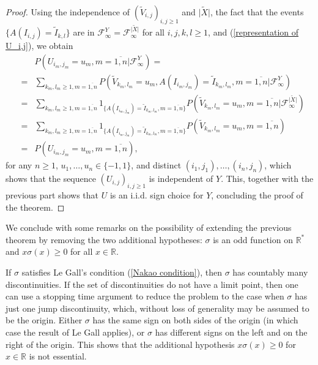 \documentclass[reqno]{amsart}
\theoremstyle{definition}
\theoremstyle{remark}
\numberwithin{equation}{section}
\begin{document}
\begin{proof}
Using the independence of $(\widetilde{V}_{i,j})_{i,j\ge 1}$ and $\vert\widetilde{X}\vert$, the fact that the events $\{A(I_{i,j})=\widetilde{I}_{k,l}\}$ are in $\mathcal{F}_\infty^Y=\mathcal{F}^{\vert\widetilde{X}\vert}_{\infty}$ for all $i,j,k,l\ge 1$, and (\ref{representation of U_i,j}), we obtain
\begin{eqnarray*}
&&P\left(U_{i_m,j_m}=u_m, m=\overline{1,n}\big\vert \mathcal{F}_{\infty}^{Y}\right)=\\
&=&\sum_{k_m,l_m\ge 1, m=\overline{1,n}}P\left(\widetilde{V}_{k_m,l_m}=u_m, A(I_{i_m,j_m})=\widetilde{I}_{k_m,l_m}, m=\overline{1,n} \big\vert \mathcal{F}_{\infty}^{{Y}}\right)\\
&=&\sum_{k_m,l_m\ge 1, m=\overline{1,n}}1_{\{A(I_{i_m,j_m})=\widetilde{I}_{k_m,l_m}, m=\overline{1,n}\}} P\left(\widetilde{V}_{k_m,l_m}=u_m, m=\overline{1,n} \big\vert \mathcal{F}_{\infty}^{\vert\widetilde{X}\vert}\right)\\
&=&\sum_{k_m,l_m\ge 1, m=\overline{1,n}}1_{\{A(I_{i_m,j_m})=\widetilde{I}_{k_m,l_m}, m=\overline{1,n}\}} P\left(\widetilde{V}_{k_m,l_m}=u_m, m=\overline{1,n}\right)\\
&=&P\left(U_{i_m,j_m}=u_m, m=\overline{1,n}\right),
\end{eqnarray*}
for any $n\ge 1$, $u_1,\ldots,u_n\in\{-1,1\}$, and distinct $(i_1,j_1),\ldots,(i_n,j_n)$, which shows that the sequence $(U_{i,j})_{i,j\ge 1}$ is independent of $Y$. This, together with the previous part shows that $U$ is an i.i.d. sign choice for $Y$, concluding the proof of the theorem.
\end{proof}

We conclude with some remarks on the possibility of extending the previous
theorem by removing the two additional hypotheses: $\sigma $ is an odd
function on $\mathbb{R}^{\ast }$ and $x\sigma \left( x\right) \geq 0$ for
all $x\in \mathbb{R}$.

If $\sigma $ satisfies Le Gall's condition (\ref{Nakao condition}), then $\sigma $ has countably many discontinuities. If the set of discontinuities
do not have a limit point, then one can use a stopping time argument to
reduce the problem to the case when $\sigma $ has just one jump discontinuity, which,
without loss of generality may be assumed to be the origin. Either $\sigma $ has
the same sign on both sides of the origin (in which case the result of Le Gall
applies), or $\sigma $ has different signs on the left and on the right of
the origin. This shows that the additional hypothesis $x\sigma \left( x\right)
\geq 0$ for $x\in \mathbb{R}$ is not essential.
\end{document}
